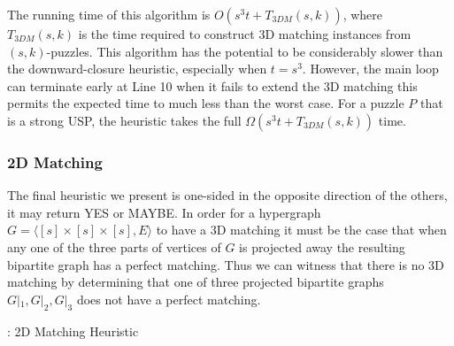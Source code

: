 \documentclass[11pt]{article}
\begin{document}
The running time of this algorithm is $O(s^3 t + T_{3DM}(s,k))$, where
$T_{3DM}(s,k)$ is the time required to construct 3D matching
instances from $(s,k)$-puzzles.  This algorithm has the potential to
be considerably slower than the downward-closure heuristic, especially
when $t = s^3$.  However, the main loop can terminate early at Line 10
when it fails to extend the 3D matching this permits the expected time
to much less than the worst case.  For a puzzle $P$ that is a strong
USP, the heuristic takes the full $\Omega(s^3 t + T_{3DM}(s,k))$ time.


\begin{comment}


\subsubsection{Graph Automorphism}

A strong uniquely-solvable puzzle must also be a uniquely-solvable
puzzle.  Given a puzzle $P$ we can construct a graph $G_P$ such that
$G_P$ is rigid iff $P$ is a uniquely-solvable puzzle.

XXX - I don't think this idea worked out.  The code correctly
implemented the approach, but the approach was flawed.  Probably
remove this section or add to future work.

\end{comment}

\subsubsection{2D Matching}

The final heuristic we present is one-sided in the opposite direction
of the others, it may return YES or MAYBE.  In order for a hypergraph
$G = \langle [s] \times [s] \times [s], E\rangle$ to have a 3D
matching it must be the case that when any one of the three parts of
vertices of $G$ is projected away the resulting bipartite graph has a
perfect matching.  Thus we can witness that there is no 3D matching by
determining that one of three projected bipartite graphs $G|_1, G|_2,
G|_3$ does not have a perfect matching.

\begin{algorithm}
  \caption{: 2D Matching Heuristic}
  \label{alg:2dm}
\begin{algorithmic}[1]

  \Else
  \EndIf
  \EndFunction
\end{algorithmic}
\end{algorithm}
\end{document}
